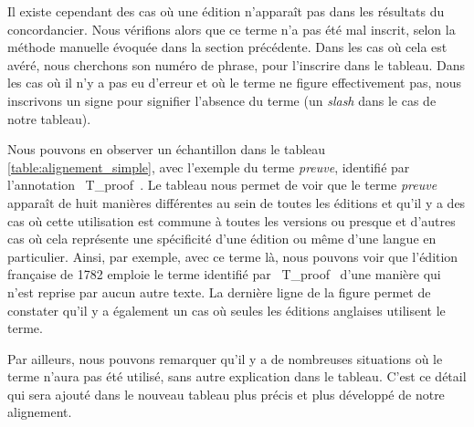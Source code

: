 Il existe cependant des cas où une édition n’apparaît pas dans les résultats du concordancier. Nous vérifions alors que ce terme n’a pas été mal inscrit, selon la méthode manuelle évoquée dans la section précédente. Dans les cas où cela est avéré, nous cherchons son numéro de phrase, pour l’inscrire dans le tableau. Dans les cas où il n’y a pas eu d’erreur et où le terme ne figure effectivement pas, nous inscrivons un signe pour signifier l’absence du terme (un \emph{slash} dans le cas de notre tableau). 

Nous pouvons en observer un échantillon dans le tableau \ref{table:alignement_simple}, avec l’exemple du terme \textit{preuve}, identifié par l’annotation \og~T\_proof~\fg{}.
Le tableau nous permet de voir que le terme \textit{preuve} apparaît de huit manières différentes au sein de toutes les éditions et qu’il y a des cas où cette utilisation est commune à toutes les versions ou presque et d’autres cas où cela représente une spécificité d’une édition ou même d’une langue en particulier. Ainsi, par exemple, avec ce terme là, nous pouvons voir que l’édition française de 1782 emploie le terme identifié par \og~T\_proof~\fg{} d’une manière qui n’est reprise par aucun autre texte. La dernière ligne de la figure permet de constater qu’il y a également un cas où seules les éditions anglaises utilisent le terme. 

Par ailleurs, nous pouvons remarquer qu’il y a de nombreuses situations où le terme n’aura pas été utilisé, sans autre explication dans le tableau. C’est ce détail qui sera ajouté dans le nouveau tableau plus précis et plus développé de notre alignement.

